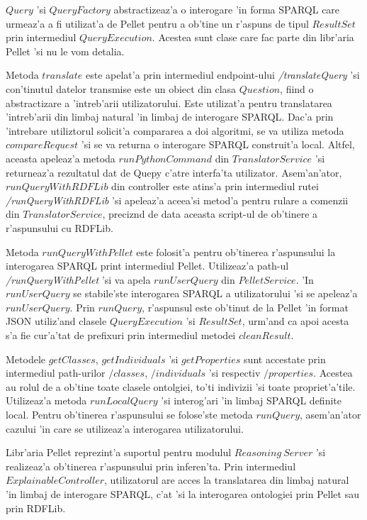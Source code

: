 \documentclass[12pt,a4paper,twoside]{report}
\begin{document}
$Query$ 'si $QueryFactory$ abstractizeaz'a o interogare 'in forma SPARQL care urmeaz'a a fi utilizat'a de Pellet pentru a ob'tine un r'aspuns de tipul $ResultSet$ prin intermediul $QueryExecution$. Acestea sunt clase care fac parte din libr'aria Pellet 'si nu le vom detalia.

Metoda $translate$ este apelat'a prin intermediul endpoint-ului {\it /translateQuery} 'si con'tinutul datelor transmise este un obiect din clasa $Question$, fiind o abstractizare a 'intreb'arii utilizatorului. Este utilizat'a pentru translatarea 'intreb'arii din limbaj natural 'in limbaj de interogare SPARQL.  Dac'a prin 'intrebare utiliztorul solicit'a compararea a doi algoritmi, se va utiliza metoda $compareRequest$ 'si se va returna o interogare SPARQL construit'a local. Altfel, aceasta apeleaz'a metoda $runPythonCommand$ din $TranslatorService$ 'si returneaz'a rezultatul dat de Quepy c'atre interfa'ta utilizator. Asem'an'ator, $runQueryWithRDFLib$ din controller este atins'a prin intermediul rutei {\it /runQueryWithRDFLib} 'si apeleaz'a aceea'si metod'a pentru rulare a comenzii din $TranslatorService$, preciz\ia nd de data aceasta script-ul de ob'tinere a r'aspunsului cu RDFLib.

Metoda $runQueryWithPellet$ este folosit'a pentru ob'tinerea r'aspunsului la interogarea SPARQL print intermediul Pellet. Utilizeaz'a path-ul {\it /runQueryWithPellet} 'si va apela $runUserQuery$ din $PelletService$. 'In $runUserQuery$ se stabile'ste interogarea SPARQL a utilizatorului 'si se apeleaz'a $runUserQuery$. Prin $runQuery$, r'aspunsul este ob'tinut de la Pellet 'in format JSON utiliz'and clasele $QueryExecution$ 'si $ResultSet$, urm'and ca apoi acesta s'a fie cur'a'tat de prefixuri prin intermediul metodei $cleanResult$.

Metodele $getClasses$, $getIndividuals$ 'si $getProperties$ sunt accestate prin intermediul path-urilor $/classes$, $/individuals$ 'si respectiv $/properties$. Acestea au rolul de a ob'tine toate clasele ontolgiei, to'ti indivizii 'si toate propriet'a'tile. Utilizeaz'a metoda $runLocalQuery$ 'si interog'ari 'in limbaj SPARQL definite local. Pentru ob'tinerea r'aspunsului se folose'ste metoda $runQuery$, asem'an'ator cazului 'in care se utilizeaz'a interogarea utilizatorului.

Libr'aria Pellet reprezint'a suportul pentru modulul $Reasoning\ Server$ 'si realizeaz'a ob'tinerea r'aspunsului prin inferen'ta. Prin intermediul $ExplainableController$, utilizatorul are acces la translatarea din limbaj natural 'in limbaj de interogare SPARQL, c'at 'si la interogarea ontologiei prin Pellet sau prin RDFLib.
\end{document}
